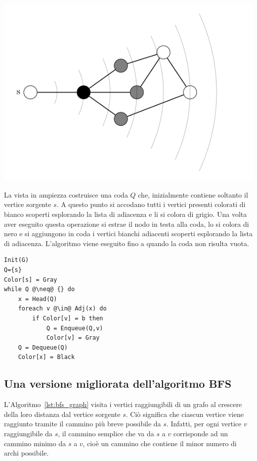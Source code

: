 \begin{center}
	\includegraphics{res/dfs_frontiera}
\end{center}

La vista in ampiezza costruisce una coda $Q$ che, inizialmente contiene soltanto il vertice sorgente $s$. A questo punto si accodano tutti i vertici presenti colorati di bianco scoperti esplorando la lista di adiacenza e li si colora di grigio. Una volta aver eseguito questa operazione si estrae il nodo in testa alla coda, lo si colora di nero e si aggiungono in coda i  vertici bianchi adiacenti scoperti esplorando la lista di adiacenza. L'algoritmo viene eseguito fino a quando la coda non risulta vuota.


\begin{lstlisting}[language=asd,caption={BFS(G,s)},label=lst:bfs_graph]
Init(G)
Q={s}
Color[s] = Gray
while Q @\neq@ {} do
	x = Head(Q)
	foreach v @\in@ Adj(x) do
		if Color[v] = b then
			Q = Enqueue(Q,v)
			Color[v] = Gray
	Q = Dequeue(Q)
	Color[x] = Black
\end{lstlisting}

\subsection{Una versione migliorata dell'algoritmo BFS}
L'Algoritmo~\ref{lst:bfs_graph} visita i vertici raggiungibili di un grafo al crescere della loro distanza dal vertice sorgente $s$. Ciò significa che ciascun vertice viene raggiunto tramite il cammino più breve possibile da $s$. Infatti, per ogni vertice $v$ raggiungibile da $s$, il cammino semplice che va da $s$ a $v$ corrisponde ad un cammino minimo da $s$ a $v$, cioè un cammino che contiene il minor numero di archi possibile.

